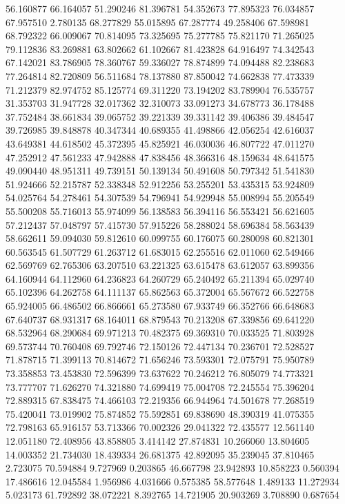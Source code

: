 56.160877
66.164057
51.290246
81.396781
54.352673
77.895323
76.034857
67.957510
2.780135
68.277829
55.015895
67.287774
49.258406
67.598981
68.792322
66.009067
70.814095
73.325695
75.277785
75.821170
71.265025
79.112836
83.269881
63.802662
61.102667
81.423828
64.916497
74.342543
67.142021
83.786905
78.360767
59.336027
78.874899
74.094488
82.238683
77.264814
82.720809
56.511684
78.137880
87.850042
74.662838
77.473339
71.212379
82.974752
85.125774
69.311220
73.194202
83.789904
76.535757
31.353703
31.947728
32.017362
32.310073
33.091273
34.678773
36.178488
37.752484
38.661834
39.065752
39.221339
39.331142
39.406386
39.484547
39.726985
39.848878
40.347344
40.689355
41.498866
42.056254
42.616037
43.649381
44.618502
45.372395
45.825921
46.030036
46.807722
47.011270
47.252912
47.561233
47.942888
47.838456
48.366316
48.159634
48.641575
49.090440
48.951311
49.739151
50.139134
50.491608
50.797342
51.541830
51.924666
52.215787
52.338348
52.912256
53.255201
53.435315
53.924809
54.025764
54.278461
54.307539
54.796941
54.929948
55.008994
55.205549
55.500208
55.716013
55.974099
56.138583
56.394116
56.553421
56.621605
57.212437
57.048797
57.415730
57.915226
58.288024
58.696384
58.563439
58.662611
59.094030
59.812610
60.099755
60.176075
60.280098
60.821301
60.563545
61.507729
61.263712
61.683015
62.255516
62.011060
62.549466
62.569769
62.765306
63.207510
63.221325
63.615478
63.612057
63.899356
64.160944
64.112960
64.236823
64.260729
65.240492
65.211394
65.029740
65.102396
64.262758
64.111137
65.862563
65.372004
65.567672
66.522758
65.924005
66.486502
66.866661
65.273580
67.933749
66.352766
66.648683
67.640737
68.931317
68.164011
68.879543
70.213208
67.339856
69.641220
68.532964
68.290684
69.971213
70.482375
69.369310
70.033525
71.803928
69.573744
70.760408
69.792746
72.150126
72.447134
70.236701
72.528527
71.878715
71.399113
70.814672
71.656246
73.593301
72.075791
75.950789
73.358853
73.453830
72.596399
73.637622
70.246212
76.805079
74.773321
73.777707
71.626270
74.321880
74.699419
75.004708
72.245554
75.396204
72.889315
67.838475
74.466103
72.219356
66.944964
74.501678
77.268519
75.420041
73.019902
75.874852
75.592851
69.838690
48.390319
41.075355
72.798163
65.916157
53.713366
70.002326
29.041322
72.435577
12.561140
12.051180
72.408956
43.858805
3.414142
27.874831
10.266060
13.804605
14.003352
21.734030
18.439334
26.681375
42.892095
35.239045
37.810465
2.723075
70.594884
9.727969
0.203865
46.667798
23.942893
10.858223
0.560394
17.486616
12.045584
1.956986
4.031666
0.575385
58.577648
1.489133
11.272934
5.023173
61.792892
38.072221
8.392765
14.721905
20.903269
3.708890
0.687654
